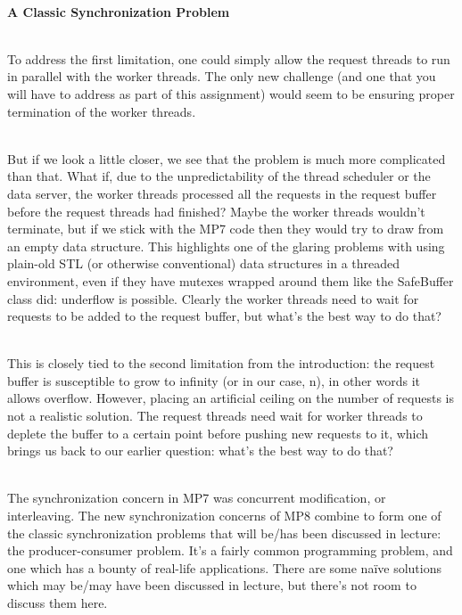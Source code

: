 \documentclass[12pt]{extarticle}
\newenvironment{myindentpar}[1]%
 {\begin{list}{}%
         {\setlength{\leftmargin}{#1}}%
         \item[]%
 }
 {\end{list}}
\begin{document}
\begin{myindentpar}{5mm}

    \noindent
    \ \\
    \textbf{A Classic Synchronization Problem}
    
    \vspace{-3mm}
    \ \\
    To address the first limitation, one could simply allow the request threads to run in parallel with the worker threads. The only new challenge (and one that you will have to address as part of this assignment) would seem to be ensuring proper termination of the worker threads.
    
    \ \\
	But if we look a little closer, we see that the problem is much more complicated than that. What if, due to the unpredictability of the thread scheduler or the data server, the worker threads processed all the requests in the request buffer before the request threads had finished? Maybe the worker threads wouldn’t terminate, but if we stick with the MP7 code then they would try to draw from an empty data structure. This highlights one of the glaring problems with using plain-old STL (or otherwise conventional) data structures in a threaded environment, even if they have mutexes wrapped around them like the SafeBuffer class did: underflow is possible. Clearly the worker threads need to wait for requests to be added to the request buffer, but what’s the best way to do that?
	
	\ \\
	This is closely tied to the second limitation from the introduction: the request buffer is susceptible to grow to infinity (or in our case, n), in other words it allows overflow. However, placing an artificial ceiling on the number of  requests is not a realistic solution. The request threads need wait for worker threads to deplete the buffer to a certain point before pushing new requests to it, which brings us back to our earlier question: what’s the best way to do that?
	
	\ \\
	The synchronization concern in MP7 was concurrent modification, or interleaving. The new synchronization concerns of MP8 combine to form one of the classic synchronization problems that will be/has been discussed in lecture: the producer-consumer problem. It’s a fairly common programming problem, and one which has a bounty of real-life applications. There are some naïve solutions which may be/may have been discussed in lecture, but there’s not room to discuss them here.
	

\end{myindentpar}
\end{document}

